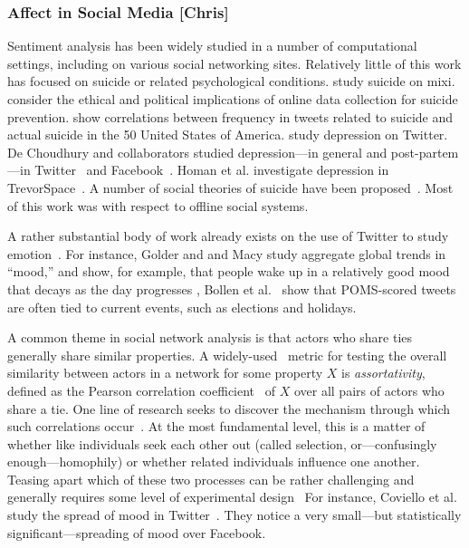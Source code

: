 \documentclass[11pt]{article}
\begin{document}
\subsubsection{Affect in Social Media [Chris]}

Sentiment analysis has been widely studied in a number of computational settings, including on various social networking sites. Relatively little of this work has focused on suicide or related psychological conditions. \cite{masuda2013suicide} study suicide on mixi. \cite{cheng2012opportunities} consider the ethical and political implications of online data collection for suicide prevention. \cite{Jay} show correlations between frequency in tweets related to suicide and actual suicide in the 50 United States of America. \cite{sadilek2014modeling} study depression on Twitter. De Choudhury and collaborators studied depression---in general and post-partem---in Twitter~\cite{de2012not,de2012happy,de2013major,de2013understanding} and Facebook~\cite{de2014characterizing}. Homan et al. investigate depression in TrevorSpace~\cite{homan2014social}. A number of social theories of suicide have been proposed~\cite{wray2011sociology}. Most of this work was with respect to offline social systems. 

A rather substantial body of work already exists on the use of Twitter to study emotion~\cite{bollen2011twitter,dodds2011temporal,wang2012harnessing,pfitzner2012emotional,kim2012you,bollen2011happiness,pfitzner2012emotional,bollen2011modeling,mohammad2012emotional,golder2011diurnal,de2012not,de2012happy,de2013major,de2013understanding,hannak2012tweetin,thelwall2011sentiment,pak2010twitter}. For instance,
Golder and and Macy study aggregate global trends in ``mood,'' and show, for example, that people wake up in a relatively good mood that decays as the day progresses \cite{golder2011diurnal}, Bollen et al.~\cite{bollen2011modeling} show that POMS-scored tweets are often tied to current events, such as elections and holidays.

A common theme in social network analysis is that actors who share ties generally share similar properties. A widely-used~\cite{bliss2012twitter,coviello2014,bollen2011happiness} metric for testing the overall similarity between 
actors in a network for some property $X$ is \emph{assortativity}, defined as  the Pearson correlation coefficient~\cite{newman2002assortative} of $X$ over all pairs of actors who share a tie.  One line of research seeks
to discover the mechanism through which such correlations occur~\cite{newman2002assortative}. 
At the most fundamental level, this is a matter of whether like individuals seek each other out (called selection, or---confusingly enough---homophily) or whether related individuals influence one another. Teasing apart which of these two processes can be rather challenging and generally requires some level of experimental design~\cite{centola2010spread,centola2011experimental}
For instance, Coviello et al. study the spread of mood in Twitter~\cite{coviello2014}. They notice a very small---but statistically significant---spreading of mood over Facebook. 
\end{document}
